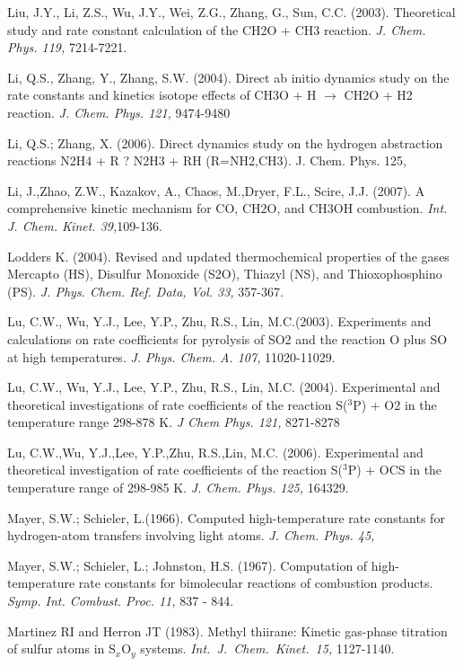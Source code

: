 \documentclass[12pt,landscape]{article}
\newcounter{reaction}
\begin{document}
Liu, J.Y., Li, Z.S., Wu, J.Y., Wei, Z.G., Zhang, G., Sun, C.C. (2003). Theoretical study and rate constant calculation of the CH2O + CH3 reaction.  {\em J. Chem. Phys. 119,} 7214-7221.

Li, Q.S., Zhang, Y., Zhang, S.W. (2004). Direct ab initio dynamics study on the rate constants and kinetics isotope effects of CH3O + H $\rightarrow$ CH2O + H2 reaction. {\em J. Chem. Phys. 121,}  9474-9480

Li, Q.S.; Zhang, X. (2006).   Direct dynamics study on the hydrogen abstraction reactions N2H4 + R ? N2H3 + RH (R=NH2,CH3).  J. Chem. Phys. 125,

Li, J.,Zhao, Z.W., Kazakov, A., Chaos, M.,Dryer, F.L., Scire, J.J. (2007). A comprehensive kinetic mechanism for CO, CH2O, and CH3OH combustion. {\em  Int. J. Chem. Kinet. 39,}109-136.

Lodders K. (2004). Revised and updated thermochemical properties of the gases Mercapto (HS), Disulfur Monoxide (S2O), Thiazyl (NS), and Thioxophosphino (PS). {\em J. Phys. Chem. Ref. Data, Vol. 33,} 357-367.

Lu, C.W., Wu, Y.J., Lee, Y.P., Zhu, R.S., Lin, M.C.(2003). Experiments and calculations on rate coefficients for pyrolysis of SO2 and the reaction O plus SO at high temperatures. {\em J. Phys. Chem. A. 107,} 11020-11029.

Lu, C.W., Wu, Y.J., Lee, Y.P., Zhu, R.S., Lin, M.C. (2004). Experimental and theoretical investigations of rate coefficients of the reaction S($^3$P) + O2 in the temperature range 298-878 K.  {\em J Chem Phys. 121,} 8271-8278

Lu, C.W.,Wu, Y.J.,Lee, Y.P.,Zhu, R.S.,Lin, M.C. (2006).  Experimental and theoretical investigation of rate coefficients of the reaction S($^3$P) + OCS in the temperature range of 298-985 K.  {\em J. Chem. Phys. 125,} 164329.

Mayer, S.W.; Schieler, L.(1966). Computed high-temperature rate constants for hydrogen-atom transfers involving light atoms.
{\em  J. Chem. Phys. 45,}

Mayer, S.W.; Schieler, L.; Johnston, H.S. (1967). Computation of high-temperature rate constants for bimolecular reactions of combustion products. {\em Symp. Int. Combust. Proc. 11,} 837 - 844.

 Martinez RI and Herron JT (1983).  Methyl thiirane: Kinetic gas-phase titration of sulfur atoms in S$_x$O$_y$ systems.  {\em Int.\ J.\ Chem.\ Kinet.\ 15,} 1127-1140.
\end{document}
